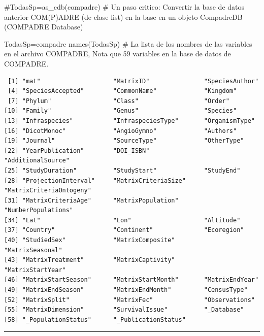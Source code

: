 \documentclass[
  12pt,
  letterpaper,
]{book}
\newenvironment{Shaded}{\begin{snugshade}}{\end{snugshade}}
\newcommand{\CommentTok}[1]{\textcolor[rgb]{0.37,0.37,0.37}{#1}}
\newcommand{\FunctionTok}[1]{\textcolor[rgb]{0.28,0.35,0.67}{#1}}
\newcommand{\NormalTok}[1]{\textcolor[rgb]{0.00,0.23,0.31}{#1}}
\newcommand{\OtherTok}[1]{\textcolor[rgb]{0.00,0.23,0.31}{#1}}
\begin{document}
\begin{Shaded}
\begin{Highlighting}[]
\CommentTok{\#TodasSp=as\_cdb(compadre)  \# Un paso critico: Convertir la base de datos anterior COM(P)ADRE (de clase \textquotesingle{}list\textquotesingle{}) en la base en un objeto CompadreDB (COMPADRE Database)}

\NormalTok{TodasSp}\OtherTok{=}\NormalTok{compadre}
\FunctionTok{names}\NormalTok{(TodasSp) }\CommentTok{\# La lista de los nombres de las variables en el archivo COMPADRE, Nota que 59 variables en la base de datos de COMPADRE.}
\end{Highlighting}
\end{Shaded}

\begin{verbatim}
 [1] "mat"                    "MatrixID"               "SpeciesAuthor"         
 [4] "SpeciesAccepted"        "CommonName"             "Kingdom"               
 [7] "Phylum"                 "Class"                  "Order"                 
[10] "Family"                 "Genus"                  "Species"               
[13] "Infraspecies"           "InfraspeciesType"       "OrganismType"          
[16] "DicotMonoc"             "AngioGymno"             "Authors"               
[19] "Journal"                "SourceType"             "OtherType"             
[22] "YearPublication"        "DOI_ISBN"               "AdditionalSource"      
[25] "StudyDuration"          "StudyStart"             "StudyEnd"              
[28] "ProjectionInterval"     "MatrixCriteriaSize"     "MatrixCriteriaOntogeny"
[31] "MatrixCriteriaAge"      "MatrixPopulation"       "NumberPopulations"     
[34] "Lat"                    "Lon"                    "Altitude"              
[37] "Country"                "Continent"              "Ecoregion"             
[40] "StudiedSex"             "MatrixComposite"        "MatrixSeasonal"        
[43] "MatrixTreatment"        "MatrixCaptivity"        "MatrixStartYear"       
[46] "MatrixStartSeason"      "MatrixStartMonth"       "MatrixEndYear"         
[49] "MatrixEndSeason"        "MatrixEndMonth"         "CensusType"            
[52] "MatrixSplit"            "MatrixFec"              "Observations"          
[55] "MatrixDimension"        "SurvivalIssue"          "_Database"             
[58] "_PopulationStatus"      "_PublicationStatus"    
\end{verbatim}

\begin{center}\rule{0.5\linewidth}{0.5pt}\end{center}
\end{document}
